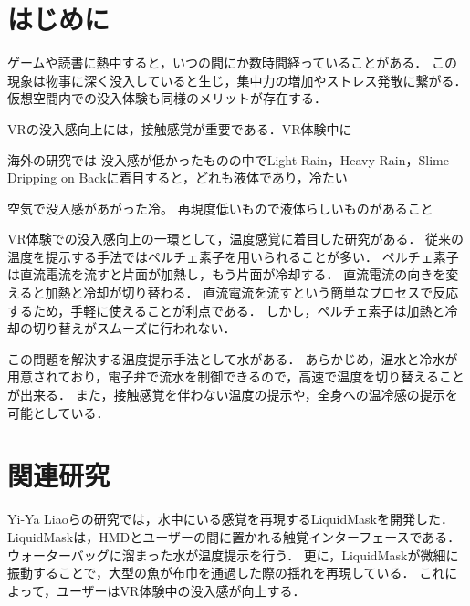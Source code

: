 \documentclass[uplatex]{jsarticle}   %
\begin{document}

\vspace{3mm}

\setcounter{page}{1}



\section{はじめに}
ゲームや読書に熱中すると，いつの間にか数時間経っていることがある．
この現象は物事に深く没入していると生じ，集中力の増加やストレス発散に繋がる．
仮想空間内での没入体験も同様のメリットが存在する．

VRの没入感向上には，接触感覚が重要である．VR体験中に

海外の研究では
没入感が低かったものの中でLight Rain，Heavy Rain，Slime Dripping on Backに着目すると，どれも液体であり，冷たい


空気で没入感があがった冷。
再現度低いもので液体らしいものがあること






VR体験での没入感向上の一環として，温度感覚に着目した研究がある．
従来の温度を提示する手法ではペルチェ素子を用いられることが多い．
ペルチェ素子は直流電流を流すと片面が加熱し，もう片面が冷却する．
直流電流の向きを変えると加熱と冷却が切り替わる．
直流電流を流すという簡単なプロセスで反応するため，手軽に使えることが利点である．
しかし，ペルチェ素子は加熱と冷却の切り替えがスムーズに行われない．

この問題を解決する温度提示手法として水がある．
あらかじめ，温水と冷水が用意されており，電子弁で流水を制御できるので，高速で温度を切り替えることが出来る．
また，接触感覚を伴わない温度の提示や，全身への温冷感の提示を可能としている．



\section{関連研究}
Yi-Ya Liaoらの研究では，水中にいる感覚を再現するLiquidMaskを開発した．
LiquidMaskは，HMDとユーザーの間に置かれる触覚インターフェースである．
ウォーターバッグに溜まった水が温度提示を行う．
更に，LiquidMaskが微細に振動することで，大型の魚が布巾を通過した際の揺れを再現している．
これによって，ユーザーはVR体験中の没入感が向上する．
\end{document}
